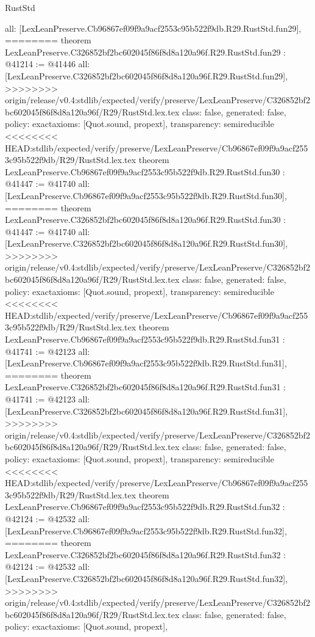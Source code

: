 \begin{lexlean}{RustStd}
\begin{coremodule}
{\begin{coremodule}
{{{{{{{{{{{{{{{{{{{{{{{{{{{{{{{{  all: [LexLeanPreserve.Cb96867ef09f9a9acf2553c95b522f9db.R29.RustStd.fun29],
========
theorem LexLeanPreserve.C326852bf2bc602045f86f8d8a120a96f.R29.RustStd.fun29 : @41214 := @41446 {
  all: [LexLeanPreserve.C326852bf2bc602045f86f8d8a120a96f.R29.RustStd.fun29],
>>>>>>>> origin/release/v0.4:stdlib/expected/verify/preserve/LexLeanPreserve/C326852bf2bc602045f86f8d8a120a96f/R29/RustStd.lex.tex
  class: false,
  generated: false,
  policy: exact{axioms: [Quot.sound, propext]},
  transparency: semireducible
}
<<<<<<<< HEAD:stdlib/expected/verify/preserve/LexLeanPreserve/Cb96867ef09f9a9acf2553c95b522f9db/R29/RustStd.lex.tex
theorem LexLeanPreserve.Cb96867ef09f9a9acf2553c95b522f9db.R29.RustStd.fun30 : @41447 := @41740 {
  all: [LexLeanPreserve.Cb96867ef09f9a9acf2553c95b522f9db.R29.RustStd.fun30],
========
theorem LexLeanPreserve.C326852bf2bc602045f86f8d8a120a96f.R29.RustStd.fun30 : @41447 := @41740 {
  all: [LexLeanPreserve.C326852bf2bc602045f86f8d8a120a96f.R29.RustStd.fun30],
>>>>>>>> origin/release/v0.4:stdlib/expected/verify/preserve/LexLeanPreserve/C326852bf2bc602045f86f8d8a120a96f/R29/RustStd.lex.tex
  class: false,
  generated: false,
  policy: exact{axioms: [Quot.sound, propext]},
  transparency: semireducible
}
<<<<<<<< HEAD:stdlib/expected/verify/preserve/LexLeanPreserve/Cb96867ef09f9a9acf2553c95b522f9db/R29/RustStd.lex.tex
theorem LexLeanPreserve.Cb96867ef09f9a9acf2553c95b522f9db.R29.RustStd.fun31 : @41741 := @42123 {
  all: [LexLeanPreserve.Cb96867ef09f9a9acf2553c95b522f9db.R29.RustStd.fun31],
========
theorem LexLeanPreserve.C326852bf2bc602045f86f8d8a120a96f.R29.RustStd.fun31 : @41741 := @42123 {
  all: [LexLeanPreserve.C326852bf2bc602045f86f8d8a120a96f.R29.RustStd.fun31],
>>>>>>>> origin/release/v0.4:stdlib/expected/verify/preserve/LexLeanPreserve/C326852bf2bc602045f86f8d8a120a96f/R29/RustStd.lex.tex
  class: false,
  generated: false,
  policy: exact{axioms: [Quot.sound, propext]},
  transparency: semireducible
}
<<<<<<<< HEAD:stdlib/expected/verify/preserve/LexLeanPreserve/Cb96867ef09f9a9acf2553c95b522f9db/R29/RustStd.lex.tex
theorem LexLeanPreserve.Cb96867ef09f9a9acf2553c95b522f9db.R29.RustStd.fun32 : @42124 := @42532 {
  all: [LexLeanPreserve.Cb96867ef09f9a9acf2553c95b522f9db.R29.RustStd.fun32],
========
theorem LexLeanPreserve.C326852bf2bc602045f86f8d8a120a96f.R29.RustStd.fun32 : @42124 := @42532 {
  all: [LexLeanPreserve.C326852bf2bc602045f86f8d8a120a96f.R29.RustStd.fun32],
>>>>>>>> origin/release/v0.4:stdlib/expected/verify/preserve/LexLeanPreserve/C326852bf2bc602045f86f8d8a120a96f/R29/RustStd.lex.tex
  class: false,
  generated: false,
  policy: exact{axioms: [Quot.sound, propext]},
}}}}}}}}}}}}}}}}}}}}}}}}}}}}}}}}}}}}
\end{coremodule}}
\end{coremodule}
\end{lexlean}
